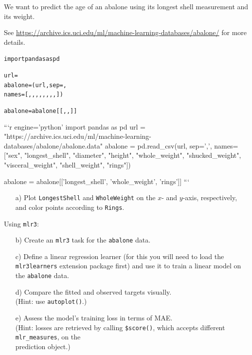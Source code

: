 


We want to predict the age of an abalone using its longest shell measurement and 
its weight.

See \url{https://archive.ics.uci.edu/ml/machine-learning-databases/abalone/} for more details.

\begin{knitrout}
\color{fgcolor}\begin{kframe}
\begin{alltt}
import pandas as pd

url = 
abalone = (url, sep=, 
                      names=[, , , , , , , , ])

abalone = abalone[[, , ]]
\end{alltt}
\end{kframe}
\end{knitrout}

```{r engine='python'}
import pandas as pd
url = "https://archive.ics.uci.edu/ml/machine-learning-databases/abalone/abalone.data"
abalone = pd.read_csv(url, sep=',', names=["sex", "longest_shell", "diameter", "height", "whole_weight", "shucked_weight", "visceral_weight", "shell_weight", "rings"])

abalone = abalone[['longest_shell', 'whole_weight', 'rings']]
```

\begin{itemize}
  \item[a)] Plot \texttt{LongestShell} and \texttt{WholeWeight} on the $x$- 
  and $y$-axis, respectively, and color points according to \texttt{Rings}.
\end{itemize}

Using \texttt{mlr3}:

\begin{itemize}
  \item[b)] Create an \texttt{mlr3} task for the \texttt{abalone} data.
  \item[c)] Define a linear regression learner (for this you will need to load 
  the \texttt{mlr3learners} extension package first) and use it to train a 
  linear model on the \texttt{abalone} data. 
  \item[d)] Compare the fitted and observed targets visually. \\
  (Hint: use \texttt{autoplot()}.)
  \item[e)] Assess the model's training loss in terms of MAE. \\
  (Hint: losses are retrieved by calling \texttt{\$score()}, which accepts 
  different \texttt{mlr\_measures}, on the \\ prediction object.)
\end{itemize}

